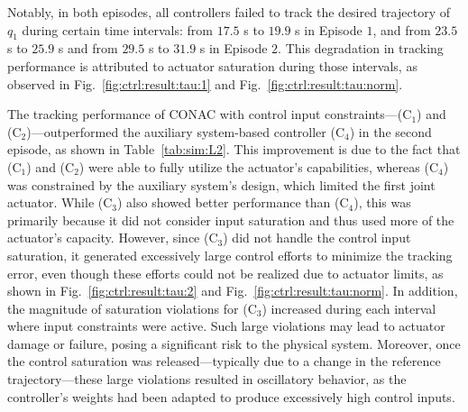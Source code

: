 \documentclass[journal]{IEEEtran}
\begin{document}
Notably, in both episodes, all controllers failed to track the desired trajectory of $q_1$ during certain time intervals: from $17.5$ s to $19.9$ s in Episode $1$, and from $23.5$ s to $25.9$ s and from $29.5$ s to $31.9$ s in Episode $2$.
This degradation in tracking performance is attributed to actuator saturation during those intervals, as observed in Fig.~\ref{fig:ctrl:result:tau:1} and Fig.~\ref{fig:ctrl:result:tau:norm}.

The tracking performance of CONAC with control input constraints—\ie (C$_1$) and (C$_2$)—outperformed the auxiliary system-based controller (C$_4$) in the second episode, as shown in Table~\ref{tab:sim:L2}.
This improvement is due to the fact that (C$_1$) and (C$_2$) were able to fully utilize the actuator's capabilities, whereas (C$_4$) was constrained by the auxiliary system's design, which limited the first joint actuator.
While (C$_3$) also showed better performance than (C$_4$), this was primarily because it did not consider input saturation and thus used more of the actuator's capacity.
However, since (C$_3$) did not handle the control input saturation, it generated excessively large control efforts to minimize the tracking error, even though these efforts could not be realized due to actuator limits, as shown in Fig.~\ref{fig:ctrl:result:tau:2} and Fig.~\ref{fig:ctrl:result:tau:norm}.
In addition, the magnitude of saturation violations for (C$_3$) increased during each interval where input constraints were active.
Such large violations may lead to actuator damage or failure, posing a significant risk to the physical system.
Moreover, once the control saturation was released—typically due to a change in the reference trajectory—these large violations resulted in oscillatory behavior, as the controller's weights had been adapted to produce excessively high control inputs.
\end{document}
